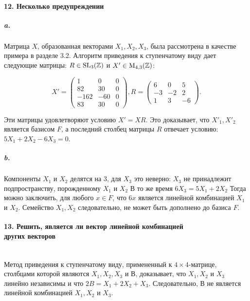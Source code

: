 \documentclass{mai_book}
\begin{document}
{\paragraph{12. Несколько предупреждении}

\subparagraph{a.} Матрица $X$, образованная векторами $X_1, X_2, X_3$, была рассмотрена в качестве примера в разделе 3.2. Алгоритм приведения к ступенчатому виду дает следующие матрицы: $R \in \rm{SL_{3}}(\mathbb {Z})$ и $X' \in \rm{M_{4,3}}(\mathbb {Z})$:

\begin{equation*}
X' = {\begin{pmatrix} 1 & 0 & 0 \\ 82 & 30 & 0 \\ -162 & -60 & 0\\ 83 & 30 & 0 \end{pmatrix}}, 
R = {\begin{pmatrix} 6 & 0 & 5 \\ -3 & -2 & 2 \\ 1 & 3 & -6 \end{pmatrix}}.
\end{equation*}

\noindent Эти матрицы удовлетворяют условию $X' = XR$. Это доказывает, что
${X'_{1},X'_{2}}$ является базисом $F$, а последний столбец матрицы $R$ отвечает
условию: $5X_1 + 2X_2 - 6X_3 = 0$.

\subparagraph{b.} Компоненты $X_1$ и $X_2$ делятся на 3, для $X_3$ это неверно: $X_3$ не
принадлежит подпространству, порожденному $X_1$ и $X_2$ В то же время
$6X_3 = 5X_1 + 2X_2$ Тогда можно заключить, для любого $x \in F$, что $6x$
является линейной комбинацией $X_1$ и $X_2$. Семейство ${X_{1},X_{2}}$ следовательно, не может быть дополнено до базиса $F$.



\paragraph{13. Решить, является ли вектор линейной комбинацией\\
других векторов} \mbox{}\\

Метод приведения к ступенчатому виду, примененный к $4 \times 4$-матрице, столбцами которой являются $X_{1}, X_{2}, X_{3}$ и $В$, доказывает, что $X_{1}, X_{2}$ и $X_{3}$ линейно независимы и что $2B = X_1 + 2X_2 + X_3$. Следовательно, $В$ не является линейной комбинацией $X_{1}, X_{2}$ и $X_{3}$.

}
\end{document}
